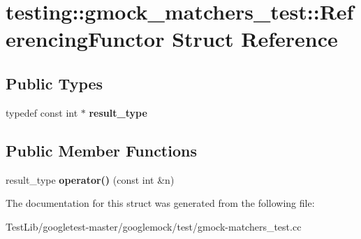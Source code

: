 \hypertarget{structtesting_1_1gmock__matchers__test_1_1ReferencingFunctor}{}\section{testing\+:\+:gmock\+\_\+matchers\+\_\+test\+:\+:Referencing\+Functor Struct Reference}
\label{structtesting_1_1gmock__matchers__test_1_1ReferencingFunctor}
\subsection*{Public Types}
\begin{DoxyCompactItemize}
\item 
\mbox{\label{structtesting_1_1gmock__matchers__test_1_1ReferencingFunctor_a5856a8175e2f797a6733a363b2834094}} 
typedef const int $\ast$ {\bfseries result\+\_\+type}
\end{DoxyCompactItemize}
\subsection*{Public Member Functions}
\begin{DoxyCompactItemize}
\item 
\mbox{\label{structtesting_1_1gmock__matchers__test_1_1ReferencingFunctor_a149f15ed9afbff28f5c3639c0f3eb255}} 
result\+\_\+type {\bfseries operator()} (const int \&n)
\end{DoxyCompactItemize}


The documentation for this struct was generated from the following file\+:\begin{DoxyCompactItemize}
\item 
Test\+Lib/googletest-\/master/googlemock/test/gmock-\/matchers\+\_\+test.\+cc\end{DoxyCompactItemize}
